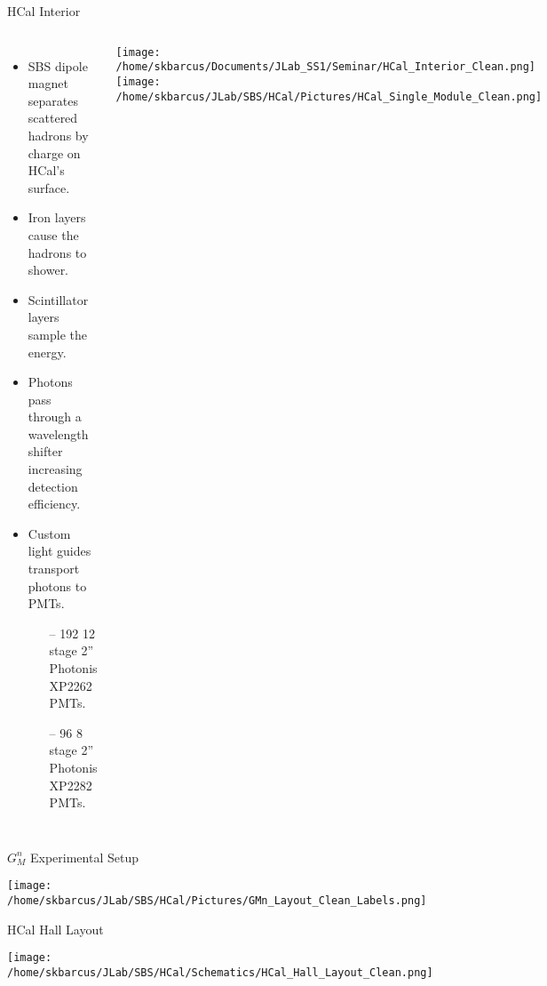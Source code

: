\documentclass[10pt]{beamer}
\begin{document}
\begin{frame}{HCal Interior}

    \begin{columns}[T,onlytextwidth]
  	
  	\begin{itemize}
  		\item SBS dipole magnet separates scattered hadrons by charge on HCal's surface.
		\item Iron layers cause the hadrons to shower. 
		\item Scintillator layers sample the energy.
		\item Photons pass through a wavelength shifter increasing detection efficiency.
		\item Custom light guides transport photons to PMTs.
			\begin{itemize}
				\item[--] 192 12 stage 2'' Photonis XP2262 PMTs.
				\item[--] 96 8 stage 2'' Photonis XP2282 PMTs.
			\end{itemize}
  	\end{itemize}

  	
  	\begin{center}
  		\vspace{5mm}
  		\texttt{[image: /home/skbarcus/Documents/JLab\_SS1/Seminar/HCal\_Interior\_Clean.png]}
		\vspace{10mm}
  		\texttt{[image: /home/skbarcus/JLab/SBS/HCal/Pictures/HCal\_Single\_Module\_Clean.png]}
  	\end{center}
  	
	\end{columns}
	
\end{frame}

\begin{frame}{$G_M^n$ Experimental Setup}

	\begin{center}
		\texttt{[image: /home/skbarcus/JLab/SBS/HCal/Pictures/GMn\_Layout\_Clean\_Labels.png]}
	\end{center}

\end{frame}

\begin{frame}{HCal Hall Layout}

	\begin{center}
		\texttt{[image: /home/skbarcus/JLab/SBS/HCal/Schematics/HCal\_Hall\_Layout\_Clean.png]}
	\end{center}
\end{frame}
\end{document}
